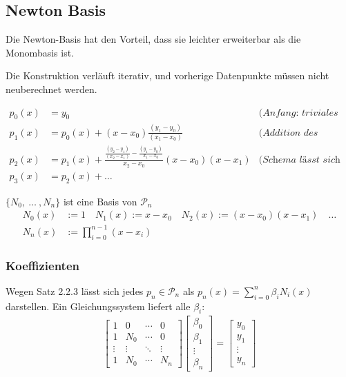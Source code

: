 \newpage
\subsection{Newton Basis}

Die Newton-Basis hat den Vorteil, dass sie leichter erweiterbar als die Monombasis ist.

Die Konstruktion verläuft iterativ, und vorherige Datenpunkte müssen nicht neuberechnet werden.

\begin{align*}
    p_0(x) &= y_0 &\textit{(Anfang: triviales Polynom)} \\
    p_1(x) &= p_0(x) + (x-x_0)\frac{(y_1-y_0)}{(x_1-x_0)} & \textit{(Addition des zweiten Datenpunktes)} \\
    p_2(x) &= p_1(x) + \frac{\frac{(y_2-y_1)}{(x_2-x_1)}-\frac{(y_1-y_0)}{x_1-x_0}}{x_2-x_0} (x-x_0)(x-x_1) & \textit{(Schema lässt sich beliebig weiterführen)}\\
    p_3(x) &= p_2(x) + \ldots
\end{align*}

 $\{ N_0,\ \ldots\ ,N_n\}$ ist eine Basis von $\mathcal{P}_n$
\begin{align*}
    N_0(x) &:= 1 \quad
    N_1(x) := x - x_0 \quad
    N_2(x) := (x-x_0)(x-x_1) \quad \ldots \\
    N_n(x) &:= \prod_{i=0}^{n-1} (x-x_i)
\end{align*}

\subsubsection{Koeffizienten}

Wegen Satz 2.2.3 lässt sich jedes $p_n \in \mathcal{P}_n$ als $p_n(x) =\displaystyle\sum_{i=0}^{n} \beta_i N_i(x)$ darstellen. Ein Gleichungssystem liefert alle $\beta_i$:
\begin{align*}
    \begin{bmatrix}
        1 & 0   & \cdots & 0 \\
        1 & N_0 & \cdots & 0 \\
        \vdots & \vdots & \ddots & \vdots \\
        1 & N_0 & \cdots & N_n
    \end{bmatrix}
    \begin{bmatrix}
        \beta_0 \\
        \beta_1 \\
        \vdots \\
        \beta_n
    \end{bmatrix}
    =
    \begin{bmatrix}
        y_0 \\
        y_1 \\
        \vdots \\
        y_n
    \end{bmatrix}
\end{align*}

